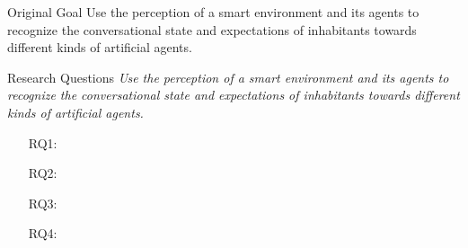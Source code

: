 \begin{frame}{Original Goal}
  \centering
  Use the perception of a smart environment and its agents to recognize the conversational state and expectations of inhabitants towards different kinds of artificial agents.
\end{frame}
\begin{frame}{Research Questions}
  \emph{Use the perception of a smart environment and its agents to recognize the conversational state and expectations of inhabitants towards different kinds of artificial agents.}
  \pause
  \begin{itemize}
      \item[RQ1:] \hypaddress
      \pause
      \item[RQ2:] \hypmeka
      \pause
      \item[RQ3:] \hypfformation
      \pause
      \item[RQ4:] \hyproles
  \end{itemize}
\end{frame}
